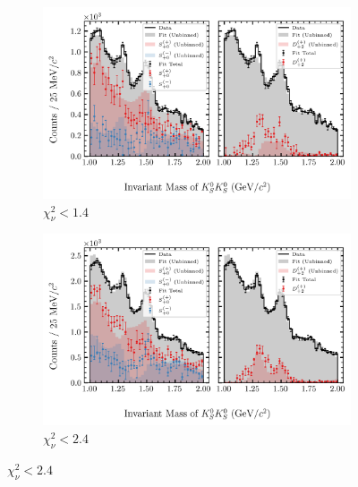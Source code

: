 \begin{figure}[htbp]
    \centering
    \begin{subfigure}{0.45\textwidth}
        \includegraphics[width=\linewidth]{figures/binned_and_unbinned_fit_chisqdof_1.4_splot_D_1s_2b_phase_factor_waves29099_uncertainty_bootstrap-SE.png}
        \caption{$\chi^2_\nu < 1.4$}
    \end{subfigure}
    \hfill
    \begin{subfigure}{0.45\textwidth}
        \includegraphics[width=\linewidth]{figures/binned_and_unbinned_fit_chisqdof_2.4_splot_D_1s_2b_phase_factor_waves29099_uncertainty_bootstrap-SE.png}
        \caption{$\chi^2_\nu < 2.4$}
    \end{subfigure}

    \vspace{1em}


\end{figure}
